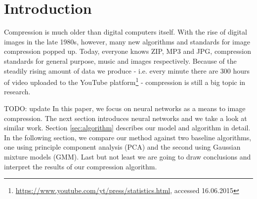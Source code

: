 
\section{Introduction} \label{sec:introduction}
 
Compression is much older than digital computers itself\cite{wolfram2002}. With the rise of digital images in the late 1980s, however, many new algorithms and standards for image compression popped up. Today, everyone knows ZIP, MP3 and JPG, compression standards for general purpose, music and images respectively. Because of the steadily rising amount of data we produce - i.e. every minute there are 300 hours of video uploaded to the YouTube platform\footnote{\url{https://www.youtube.com/yt/press/statistics.html}, accessed 16.06.2015} - compression is still a big topic in research.

{\color{red}TODO: update} In this paper, we focus on neural networks as a means to image compression. The next section introduces neural networks and we take a look at similar work. Section \ref{sec:algorithm} describes our model and algorithm in detail. In the following section, we compare our method against two baseline algorithms, one using principle component analysis (PCA) and the second using Gaussian mixture models (GMM). Last but not least we are going to draw conclusions and interpret the results of our compression algorithm.

